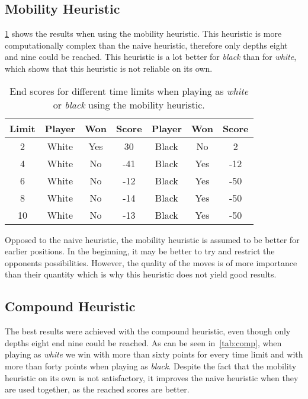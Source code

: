 \subsection{Mobility Heuristic}
\cref{tab:mobil} shows the results when using the mobility heuristic.
This heuristic is more computationally complex than the naive heuristic, therefore only depths eight and nine could be reached.
This heuristic is a lot better for \textit{black} than for \textit{white}, which shows that this heuristic is not reliable on its own.

\begin{table}[!ht]
\centering
\begin{tabular}{ |c||c|c|c||c|c|c| }
 \hline
 Limit & Player & Won & Score & Player & Won & Score \\ \hline \hline
  2 & White & Yes &  30 & Black & No  & 2 \\ 
  4 & White & No  & -41 & Black & Yes & -12 \\  
  6 & White & No  & -12 & Black & Yes & -50 \\  
  8 & White & No  & -14 & Black & Yes & -50 \\   
 10 & White & No  & -13 & Black & Yes & -50 \\ 
 \hline
\end{tabular}
\caption{\label{tab:mobil} End scores for different time limits when playing as \textit{white} or \textit{black} using the mobility heuristic.}
\end{table}

Opposed to the naive heuristic, the mobility heuristic is assumed to be better for earlier positions.
In the beginning, it may be better to try and restrict the opponents possibilities.
However, the quality of the moves is of more importance than their quantity which is why this heuristic does not yield good results.


\subsection{Compound Heuristic}
The best results were achieved with the compound heuristic, even though only depths eight end nine could be reached.
As can be seen in~\cref{tab:comp}, when playing as \textit{white} we win with more than sixty points for every time limit and with more than forty points when playing as \textit{black}.
Despite the fact that the mobility heuristic on its own is not satisfactory, it improves the naive heuristic when they are used together, as the reached scores are better.

